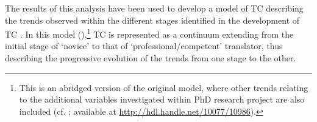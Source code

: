 \documentclass[output=paper]{LSP/langsci}
\begin{document}
The results of this analysis have been used to develop a model of TC describing the trends observed within the different stages identified in the development of TC \citep{Quinci2015b}. In this model (),\footnote{This is an abridged version of the original model, where other trends relating to the additional variables investigated within PhD research project are also included (cf. \citealt{Quinci2015b}; available at \url{http://hdl.handle.net/10077/10986}).} TC is represented as a continuum extending from the initial stage of `novice' to that of `professional/competent' translator, thus describing the progressive evolution of the trends from one stage to the other.

\begin{figure}
\end{figure}
\end{document}
